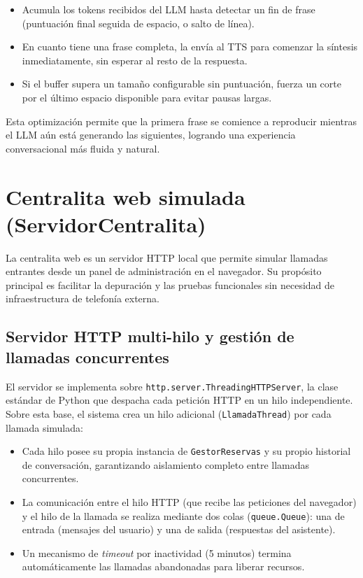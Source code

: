 \begin{itemize}
    \item Acumula los tokens recibidos del LLM hasta detectar un fin de frase (puntuación final seguida de espacio, o salto de línea).
    \item En cuanto tiene una frase completa, la envía al TTS para comenzar la síntesis inmediatamente, sin esperar al resto de la respuesta.
    \item Si el buffer supera un tamaño configurable sin puntuación, fuerza un corte por el último espacio disponible para evitar pausas largas.
\end{itemize}

Esta optimización permite que la primera frase se comience a reproducir mientras el LLM aún está generando las siguientes, logrando una experiencia conversacional más fluida y natural.

\section{Centralita web simulada (ServidorCentralita)}
\label{sec:centralita_web}

La centralita web es un servidor HTTP local que permite simular llamadas entrantes desde un panel de administración en el navegador. Su propósito principal es facilitar la depuración y las pruebas funcionales sin necesidad de infraestructura de telefonía externa.

\subsection{Servidor HTTP multi-hilo y gestión de llamadas concurrentes}
\label{subsec:servidor_multihilo}

El servidor se implementa sobre \texttt{http.server.ThreadingHTTPServer}, la clase estándar de Python que despacha cada petición HTTP en un hilo independiente. Sobre esta base, el sistema crea un hilo adicional (\texttt{LlamadaThread}) por cada llamada simulada:

\begin{itemize}
    \item Cada hilo posee su propia instancia de \texttt{GestorReservas} y su propio historial de conversación, garantizando aislamiento completo entre llamadas concurrentes.
    \item La comunicación entre el hilo HTTP (que recibe las peticiones del navegador) y el hilo de la llamada se realiza mediante dos colas (\texttt{queue.Queue}): una de entrada (mensajes del usuario) y una de salida (respuestas del asistente).
    \item Un mecanismo de \textit{timeout} por inactividad (5 minutos) termina automáticamente las llamadas abandonadas para liberar recursos.
\end{itemize}

